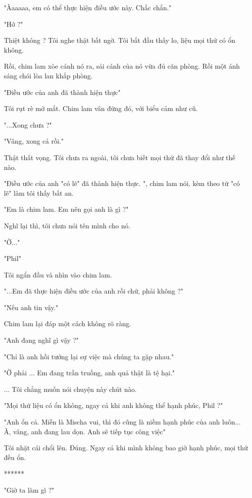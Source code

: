 "Àaaaaa, em có thể thực hiện điều ước này. Chắc chắn."

"Hở ?"

Thiệt không ? Tôi nghe thật bất ngờ. Tôi bắt đầu thấy lo, liệu mọi thứ có ổn không.

Rồi, chim lam xòe cánh nó ra, sải cánh của nó vừa đủ căn phòng. Rồi một ánh sáng chói lòa lan khắp phòng.

"Điều ước của anh đã thành hiện thực"

Tôi rụt rè mở mắt. Chim lam vân đứng đó, với biểu cảm như cũ.

"...Xong chưa ?"

"Vâng, xong cả rồi."

Thật thất vọng. Tôi chưa ra ngoài, tôi chưa biết mọi thứ đã thay đổi như thế nào.

"Điều ước của anh "có lẽ" đã thành hiện thực. ", chim lam nói, kèm theo từ "có lẽ" làm tôi thấy bất an.

"Em là chim lam. Em nên gọi anh là gì ?"

Nghĩ lại thì, tôi chưa nói tên mình cho nó.

"Ờ..."

"Phil"

Tôi ngẩn đầu và nhìn vào chim lam.

"...Em đã thực hiện điều ước của anh rồi chứ, phải không ?"

"Nếu anh tin vậy."

Chim lam lại đáp một cách không rõ ràng.

"Anh đang nghĩ gì vậy ?"

"Chỉ là anh hồi tưởng lại sự việc mà chúng ta gặp nhau."

"Ờ phải ... Em đang trần truồng, anh quả thật là tệ hại."

... Tôi chẳng muốn nói chuyện này chút nào.

"Mọi thứ liệu có ổn không, ngay cả khi anh không thể hạnh phúc, Phil ?"

"Anh ổn cả. Miễn là Mischa vui, thì đó cũng là niềm hạnh phúc của anh luôn... À, vâng, anh đang lau dọn. Anh sẽ tiếp tục công việc"

Tôi nhặt cái chổi lên. Đúng. Ngay cả khi mình không bao giờ hạnh phúc, mọi thứ đều ổn.

\begin{center}
	******
\end{center}


"Giờ ta làm gì ?"

